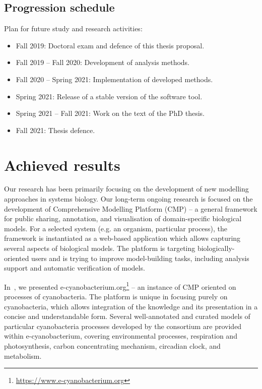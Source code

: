 \documentclass[11pt,a4paper]{report}
\begin{document}
\section{Progression schedule}

Plan for future study and research activities:

\begin{itemize}
\item Fall 2019: Doctoral exam and defence of this thesis proposal.
\item Fall 2019 -- Fall 2020: Development of analysis methods.
\item Fall 2020 -- Spring 2021: Implementation of developed methods.
\item Spring 2021: Release of a stable version of the software tool.
\item Spring 2021 -- Fall 2021: Work on the text of the PhD thesis.
\item Fall 2021: Thesis defence.
\end{itemize}


\chapter{Achieved results}

Our research has been primarily focusing on the development of new modelling approaches in systems biology. Our long-term ongoing research is focused on the development of Comprehensive Modelling Platform (CMP) -- a general framework for public sharing, annotation, and visualisation of domain-specific biological models. For a selected system (e.g. an organism, particular process), the framework is instantiated as a web-based application which allows capturing several aspects of biological models. The platform is targeting biologically-oriented users and is trying to improve model-building tasks, including analysis support and automatic verification of models.

In~\cite{trojak2016cyanobacterium}, we presented e-cyanobacterium.org\footnote{\href{https://www.e-cyanobacterium.org}{https://www.e-cyanobacterium.org}} -- an instance of CMP oriented on processes of cyanobacteria. The platform is unique in focusing purely on cyanobacteria, which allows integration of the knowledge and its presentation in a concise and understandable form. Several well-annotated and curated models of particular cyanobacteria processes developed by the consortium are provided within e-cyanobacterium, covering environmental processes, respiration and photosynthesis, carbon concentrating mechanism, circadian clock, and metabolism.
\end{document}
